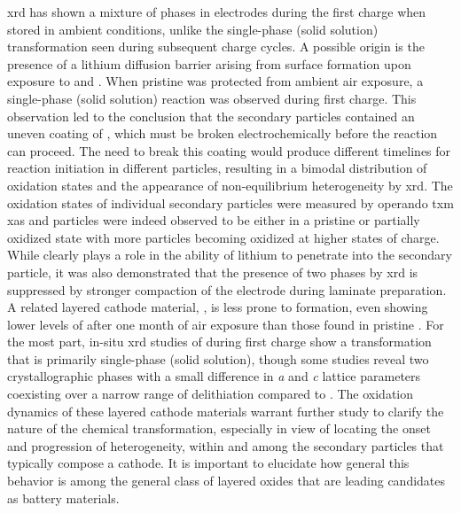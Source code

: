 \documentclass{article}
\begin{document}
 \gls{xrd} has shown a
mixture of phases in \nca{} electrodes during the first charge when
stored in ambient conditions, unlike the single-phase (solid solution)
transformation seen during subsequent charge
cycles\cite{robert2015}. A possible origin is the presence of a
lithium diffusion barrier arising from surface  formation
upon exposure to  and . When pristine \nca{} was
protected from ambient air exposure, a single-phase (solid solution)
reaction was observed during first charge\cite{grenier2017}. This
observation led to the conclusion that the secondary particles
contained an uneven coating of , which must be broken
electrochemically before the reaction can proceed. The need to break
this coating would produce different timelines for reaction initiation
in different particles, resulting in a bimodal distribution of
oxidation states and the appearance of non-equilibrium heterogeneity
by \gls{xrd}. The oxidation states of individual secondary particles
were measured by operando \gls{txm} \gls{xas} and particles were
indeed observed to be either in a pristine or partially oxidized state
with more particles becoming oxidized at higher states of
charge\cite{nowack2016}. While  clearly plays a role in the
ability of lithium to penetrate into the secondary particle, it was
also demonstrated that the presence of two phases by \gls{xrd} is
suppressed by stronger compaction of the electrode during laminate
preparation\cite{bobrikov2018}. A related layered cathode material,
\nmc[333]{}, is less prone to  formation, even showing
lower levels of  after one month of air exposure than those
found in pristine \nca{}\cite{shizuka2007}. For the most part, in-situ
\gls{xrd} studies of \nmc[333]{} during first charge show a
transformation that is primarily single-phase (solid
solution)\cite{hulzen2018,ahn2017,zhou2016-2}, though some studies
reveal two crystallographic phases with a small difference in \emph{a}
and \emph{c} lattice parameters coexisting over a narrow range of
delithiation compared to \nca{}\cite{yoon2006,hua2018}. The oxidation
dynamics of these layered cathode materials warrant further study to
clarify the nature of the chemical transformation, especially in view
of locating the onset and progression of heterogeneity, within and
among the secondary particles that typically compose a cathode. It is
important to elucidate how general this behavior is among the general
class of layered oxides that are leading candidates as battery
materials.
\end{document}
